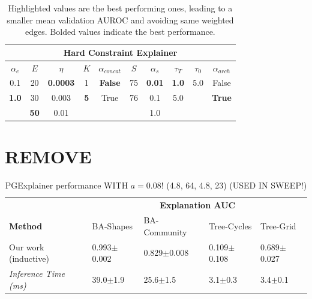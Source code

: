 \begin{table}[h]
    \centering
    \scriptsize
    \begin{tabular}{|c|c|c|c|c|c|c|c|c|c|}
    \hline
    \multicolumn{10}{|c|}{\textbf{Hard Constraint Explainer}} \\ \hline
    $\alpha_e$ & $E$ & $\eta$ & $K$ & $\alpha_{concat}$ & $S$ & $\alpha_s$ & $\tau_T$ & $\tau_0$ & $\alpha_{arch}$ \\ \hline
    0.1 & 20 & \textbf{0.0003} & 1  & \textbf{False} & 75 & \textbf{0.01} & \textbf{1.0} & 5.0 & False \\
    \textbf{1.0} & 30 & 0.003  & \textbf{5}  & True  & 76 & 0.1 & 5.0 &  & \textbf{True}  \\
        &  \textbf{50} & 0.01   &  &       &     &   1.0   &      &      &       \\ \hline
    \end{tabular}
    \caption[NeuroSAT hard constraint Sweep]{Highlighted values are the best performing ones, leading to a smaller mean validation AUROC and avoiding same weighted edges. Bolded values indicate the best performance.
    }
\end{table}


\section{REMOVE}
\begin{table}[ht]
  \centering
  \scriptsize
  \begin{tabularx}{\textwidth}{l*{4}{X}}   %
  \toprule
  \textbf{} & \multicolumn{4}{c}{\textbf{Explanation AUC}} \\
  \cmidrule{2-5}
  \textbf{Method} & BA-Shapes & BA-Community & Tree-Cycles & Tree-Grid \\
  \midrule
  Our work (inductive) & 0.993$\pm$0.002 & 0.829$\pm$0.008 & 0.109$\pm$0.108 & 0.689$\pm$0.027 \\
  \addlinespace
  \midrule
  \midrule
  \textit{Inference Time (ms)} & 39.0$\pm$1.9 & 25.6$\pm$1.5 & 3.1$\pm$0.3 & 3.4$\pm$0.1 \\
  \bottomrule
  \end{tabularx}
  \caption[REMOVE! PGExplainer with $a=0.08$!]{PGExplainer performance WITH $a=0.08$! (4.8, 64, 4.8, 23) (USED IN SWEEP!)}
  \label{tab:rem1}
\end{table}


